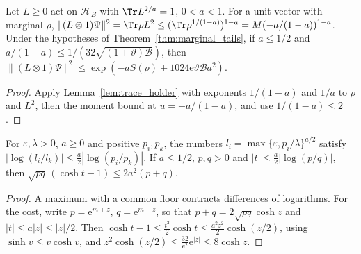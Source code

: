 \begin{lemma}
    \label{lem:filter_norm}
    \leanok
    Let $L\ge0$ act on $\mathcal H_B$ with $\Tr L^{2/a}=1$, $0<a<1$. For a
    unit vector with marginal $\rho$, $\lVert(L\otimes1)\Psi\rVert^2=\Tr\rho
        L^2\le(\Tr\rho^{1/(1-a)})^{1-a}=M(-a/(1-a))^{1-a}$. Under the hypotheses
    of Theorem~\ref{thm:marginal_tails}, if $a\le1/2$ and
    $a/(1-a)\le1/(32\sqrt{(1+\vartheta)\mathcal B})$, then
    $\lVert(L\otimes1)\Psi\rVert^2\le\exp(-aS(\rho)+1024\mathrm e\vartheta
        \mathcal Ba^2)$.
\end{lemma}
\begin{proof}\leanok
    Apply Lemma~\ref{lem:trace_holder} with exponents $1/(1-a)$ and $1/a$ to
    $\rho$ and $L^2$, then the moment bound at $u=-a/(1-a)$, and use
    $1/(1-a)\le2$.
\end{proof}

\begin{lemma}
    \label{lem:clipped_filter_cost}
    \leanok
    For $\varepsilon,\lambda>0$, $a\ge0$ and positive $p_i,p_k$, the numbers
    $l_i=\max\{\varepsilon,p_i/\lambda\}^{a/2}$ satisfy
    $|\log(l_i/l_k)|\le\frac a2|\log(p_i/p_k)|$. If $a\le1/2$, $p,q>0$ and
    $|t|\le\frac a2|\log(p/q)|$, then
    $\sqrt{pq}\,(\cosh t-1)\le2a^2(p+q)$.
\end{lemma}
\begin{proof}\leanok
    A maximum with a common floor contracts differences of logarithms. For
    the cost, write $p=\mathrm e^{m+z}$, $q=\mathrm e^{m-z}$, so that
    $p+q=2\sqrt{pq}\cosh z$ and $|t|\le a|z|\le|z|/2$. Then
    $\cosh t-1\le\frac{t^2}2\cosh t\le\frac{a^2z^2}2\cosh(z/2)$, using
    $\sinh v\le v\cosh v$, and
    $z^2\cosh(z/2)\le\frac{32}{\mathrm e^2}\mathrm e^{|z|}\le8\cosh z$.
\end{proof}

